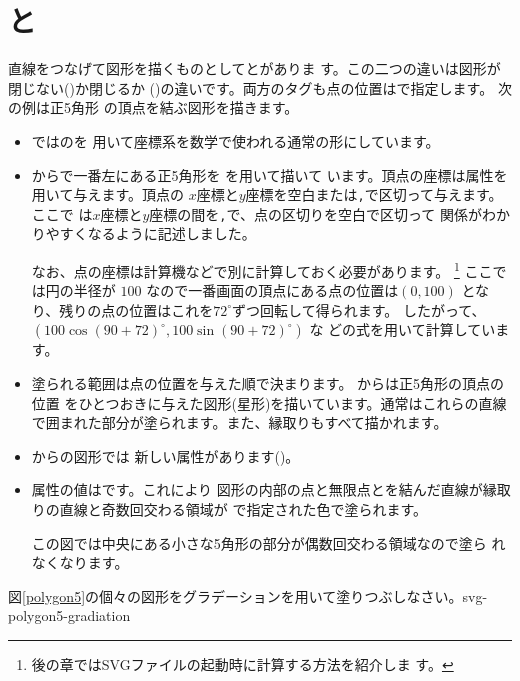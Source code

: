 \section{と}
直線をつなげて図形を描くものとしてとがありま
す。この二つの違いは図形が閉じない()か閉じるか
()の違いです。両方のタグも点の位置はで指定します。
次の例は正5角形
の頂点を結ぶ図形を描きます。
{}
\begin{itemize}
 \item {}ではのを
       用いて座標系を数学で使われる通常の形にしています。
 \item {}からで一番左にある正5角形を
       を用いて描いて
       います。頂点の座標は属性を用いて与えます。頂点の
       $x$座標と$y$座標を空白または\texttt{,}で区切って与えます。ここで
       は$x$座標と$y$座標の間を\texttt{,}で、点の区切りを空白で区切って
       関係がわかりやすくなるように記述しました。

      なお、点の座標は計算機などで別に計算しておく必要があります。
\footnote{後の章ではSVGファイルの起動時に計算する方法を紹介しま
       す。}
ここでは円の半径が $100$ なので一番画面の頂点にある点の位置は$(0,100)$
       となり、残りの点の位置はこれを$72^{\circ}$ずつ回転して得られます。
       したがって、$(100\cos(90+72)^{\circ},100\sin(90+72)^{\circ})$ な
       どの式を用いて計算しています。
 \item 塗られる範囲は点の位置を与えた順で決まります。
       からは正5角形の頂点の位置
       をひとつおきに与えた図形(星形)を描いています。通常はこれらの直線
       で囲まれた部分が塗られます。また、縁取りもすべて描かれます。
 \item {}からの図形では
       新しい属性があります()。
 \item 属性の値はです。これにより
       図形の内部の点と無限点とを結んだ直線が縁取りの直線と奇数回交わる領域が
       で指定された色で塗られます。

       この図では中央にある小さな5角形の部分が偶数回交わる領域なので塗ら
       れなくなります。
\end{itemize}
{図\ref{polygon5}の個々の図形をグラデーションを用いて塗りつぶしなさい。}{svg-polygon5-gradiation}

